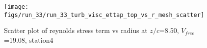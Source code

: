 \begin{figure}[H]
\centering
\texttt{[image: figs/run\_33/run\_33\_turb\_visc\_ettap\_top\_vs\_r\_mesh\_scatter]}
\caption{Scatter plot of reynolds stress term vs radius at $z/c$=8.50, $V_{free}$=19.08, station4}
\label{fig:run_33_turb_visc_ettap_top_vs_r_mesh_scatter}
\end{figure}


